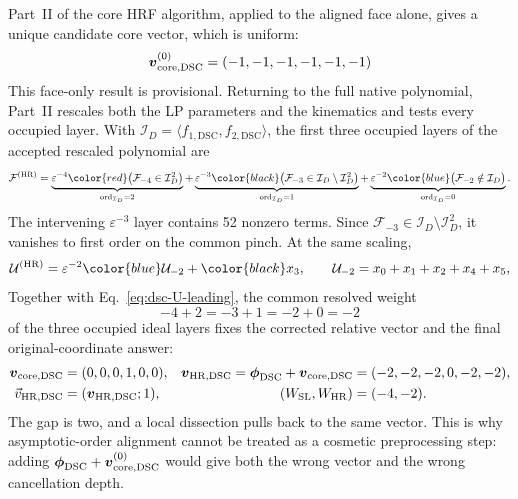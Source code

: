 \documentclass[a4paper,11pt]{article}
\newcommand{\HR}{\mathrm{HR}}
\newcommand{\WSL}{W_{\rm SL}}
\newcommand{\WHR}{W_{\rm HR}}
\newcommand{\ideal}{\mathcal I}
\newcommand{\SLcolour}[1]{{\color{red}#1}}
\newcommand{\HRcolour}[1]{{\color{blue}#1}}
\newcommand{\Othercolour}[1]{{\color{black}#1}}
\begin{document}
Part~II of the core HRF algorithm, applied to the aligned face alone, gives a
unique candidate core vector, which is uniform:
\begin{equation}
 \boldsymbol v_{\rm core,DSC}^{(0)}=(-1,-1,-1,-1,-1,-1)
 \label{eq:dsc-provisional-vector}
\end{equation}
This face-only result is provisional.  Returning to the full native
polynomial, Part~II rescales both the LP parameters and the kinematics and
tests every occupied layer.  With
\(\ideal_D=\langle f_{1,\mathrm{DSC}},f_{2,\mathrm{DSC}}\rangle\), the first
three occupied layers of the accepted rescaled polynomial are
\begin{equation}
 \mathcal F^{(\HR)}=
 \underbrace{\varepsilon^{-4}\SLcolour{\bigl(\mathcal F_{-4}\in\ideal_D^2\bigr)}}_{
  \operatorname{ord}_{\ideal_D}=2}
 +\underbrace{\varepsilon^{-3}\Othercolour{\bigl(\mathcal F_{-3}\in
  \ideal_D\setminus\ideal_D^2\bigr)}}_{\operatorname{ord}_{\ideal_D}=1}
 +\underbrace{\varepsilon^{-2}\HRcolour{\bigl(\mathcal F_{-2}\notin\ideal_D\bigr)}}_{
  \operatorname{ord}_{\ideal_D}=0}.
 \label{eq:dsc-two-layer-colours}
\end{equation}
The intervening \(\varepsilon^{-3}\) layer contains 52 nonzero terms.  Since
\(\mathcal F_{-3}\in\ideal_D\setminus\ideal_D^2\), it vanishes to first order
on the common pinch.  At the same scaling,
\begin{equation}
 \mathcal U^{(\HR)}
 =\varepsilon^{-2}\HRcolour{\mathcal U_{-2}}+\Othercolour{x_3},
 \qquad
 \mathcal U_{-2}=x_0+x_1+x_2+x_4+x_5,
 \label{eq:dsc-U-leading}
\end{equation}
Together with Eq.~\eqref{eq:dsc-U-leading}, the common resolved weight
\[
 -4+2=-3+1=-2+0=-2
\]
of the three occupied ideal layers fixes the corrected relative vector and
the final original-coordinate answer:
\begin{align}
 \boldsymbol v_{\rm core,DSC}&=(0,0,0,1,0,0),&
 \boldsymbol v_{\HR,\mathrm{DSC}}=\boldsymbol\phi_{\mathrm{DSC}}
 +\boldsymbol v_{\rm core,DSC}
   &=(-2,-2,-2,0,-2,-2),\nonumber\\
 \vec v_{\HR,\mathrm{DSC}}&=(\boldsymbol v_{\HR,\mathrm{DSC}};1),&
 (\WSL,\WHR)&=(-4,-2).
 \label{eq:dsc-vector-example}
\end{align}
The gap is two, and a local dissection pulls back to the same vector.  This
is why asymptotic-order alignment cannot be treated as a cosmetic
preprocessing step: adding
\(\boldsymbol\phi_{\mathrm{DSC}}+
\boldsymbol v_{\rm core,DSC}^{(0)}\) would give both the wrong
vector and the wrong cancellation depth.
\end{document}
